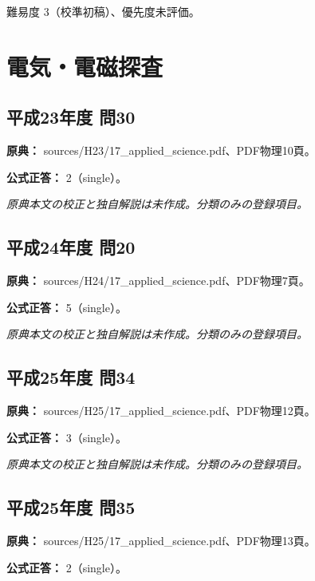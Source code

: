 \par 難易度 3（校準初稿）、優先度未評価。

\section{電気・電磁探査}

\subsection{平成23年度 問30}
\label{q:h23-reg-applied-30}

\noindent\textbf{原典：} sources/H23/17\_applied\_science.pdf、PDF物理10頁。

\textbf{公式正答：} 2（single）。

\par\textit{原典本文の校正と独自解説は未作成。分類のみの登録項目。}

\subsection{平成24年度 問20}
\label{q:h24-reg-applied-20}

\noindent\textbf{原典：} sources/H24/17\_applied\_science.pdf、PDF物理7頁。

\textbf{公式正答：} 5（single）。

\par\textit{原典本文の校正と独自解説は未作成。分類のみの登録項目。}

\subsection{平成25年度 問34}
\label{q:h25-reg-applied-34}

\noindent\textbf{原典：} sources/H25/17\_applied\_science.pdf、PDF物理12頁。

\textbf{公式正答：} 3（single）。

\par\textit{原典本文の校正と独自解説は未作成。分類のみの登録項目。}

\subsection{平成25年度 問35}
\label{q:h25-reg-applied-35}

\noindent\textbf{原典：} sources/H25/17\_applied\_science.pdf、PDF物理13頁。

\textbf{公式正答：} 2（single）。

